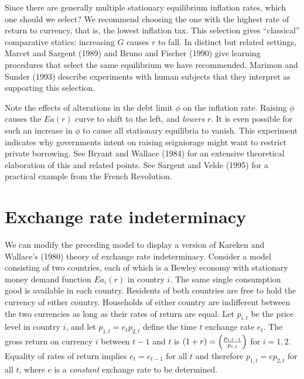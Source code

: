   Since there are generally multiple stationary equilibrium inflation
rates, which one should we select?  We recommend choosing
the one with the highest rate of return to currency, that is, the
lowest inflation tax.  This selection gives
``classical'' comparative statics: increasing $G$ causes $r$ to fall.
In  distinct but related settings, Marcet and Sargent (1989) and
Bruno and Fischer (1990) give learning procedures that select
the same equilibrium we have recommended.  Marimon and
Sunder (1993) describe experiments with human subjects
that they interpret as supporting this selection.

  Note the effects of alterations in the debt limit $\phi$ on the
inflation rate.  Raising $\phi$ causes the $E a(r)$ curve to
shift to the left, and {\it  lowers\/} $r$.  It is even possible
for such an increase in $\phi$ to cause all stationary equilibria
to vanish.  This experiment indicates why
governments intent on raising seigniorage might want to restrict
private borrowing.  See Bryant and Wallace (1984) for an
extensive theoretical elaboration of this and related points.
See Sargent and Velde (1995) for a practical example from the
French Revolution.
\section{Exchange rate indeterminacy}

We can modify the preceding model to display a version of Kareken
and Wallace's (1980) %
 theory of exchange rate indeterminacy.
Consider a model consisting of two countries, each of which  is
a Bewley economy with stationary money demand function
$E a_i(r)$ in country $i$. The same single  consumption
good is available in each country.  Residents of both countries
are free to hold the currency of either country.  Households
of either country are indifferent between the two currencies as long
as their rates of return are equal.  Let $p_{i,t}$ be the price
level in country $i$, and let $p_{1,t} = e_t p_{2,t}$ define
the time $t$ exchange rate $e_t$.  The gross return on
currency $i$ between $t-1$ and $t$ is $(1+r) = \left({p_{i,t-1}
\over p_{i,t}}\right)$ for $i=1,2$.
Equality of rates of return implies $e_t = e_{t-1}$ for all
$t$ and therefore
$ p_{1,t} = e p_{2,t}$ for all $t$, where $e$ is a {\it constant}
exchange rate to be determined.

